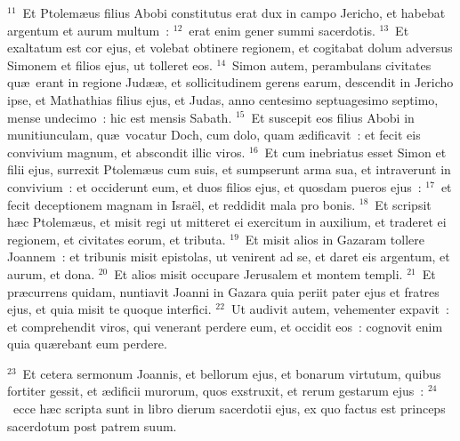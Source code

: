 ${}^{11}$~Et Ptolem\ae us filius Abobi constitutus erat dux in campo Jericho, et habebat argentum et aurum multum~:
${}^{12}$~erat enim gener summi sacerdotis.
${}^{13}$~Et exaltatum est cor ejus, et volebat obtinere regionem, et cogitabat dolum adversus Simonem et filios ejus, ut tolleret eos.
${}^{14}$~Simon autem, perambulans civitates qu\ae\ erant in regione Jud\ae \ae , et sollicitudinem gerens earum, descendit in Jericho ipse, et Mathathias filius ejus, et Judas, anno centesimo septuagesimo septimo, mense undecimo~: hic est mensis Sabath.
${}^{15}$~Et suscepit eos filius Abobi in munitiunculam, qu\ae\ vocatur Doch, cum dolo, quam \ae dificavit~: et fecit eis convivium magnum, et abscondit illic viros.
${}^{16}$~Et cum inebriatus esset Simon et filii ejus, surrexit Ptolem\ae us cum suis, et sumpserunt arma sua, et intraverunt in convivium~: et occiderunt eum, et duos filios ejus, et quosdam pueros ejus~:
${}^{17}$~et fecit deceptionem magnam in Isra\"el, et reddidit mala pro bonis.
${}^{18}$~Et scripsit h\ae c Ptolem\ae us, et misit regi ut mitteret ei exercitum in auxilium, et traderet ei regionem, et civitates eorum, et tributa.
${}^{19}$~Et misit alios in Gazaram tollere Joannem~: et tribunis misit epistolas, ut venirent ad se, et daret eis argentum, et aurum, et dona.
${}^{20}$~Et alios misit occupare Jerusalem et montem templi.
${}^{21}$~Et pr\ae currens quidam, nuntiavit Joanni in Gazara quia periit pater ejus et fratres ejus, et quia misit te quoque interfici.
${}^{22}$~Ut audivit autem, vehementer expavit~: et comprehendit viros, qui venerant perdere eum, et occidit eos~: cognovit enim quia qu\ae rebant eum perdere.


${}^{23}$~Et cetera sermonum Joannis, et bellorum ejus, et bonarum virtutum, quibus fortiter gessit, et \ae dificii murorum, quos exstruxit, et rerum gestarum ejus~:
${}^{24}$~ecce h\ae c scripta sunt in libro dierum sacerdotii ejus, ex quo factus est princeps sacerdotum post patrem suum.
